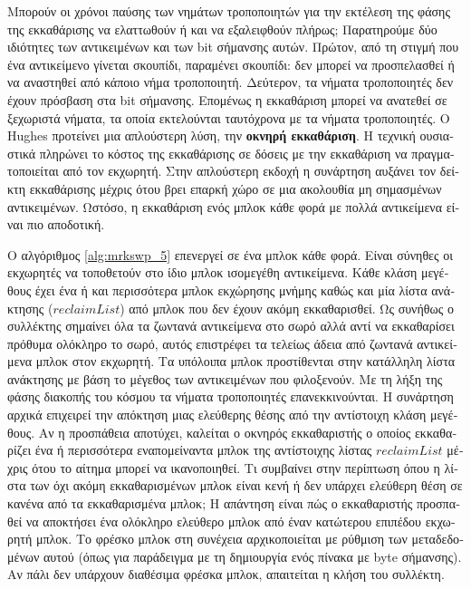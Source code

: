 \begin{greek}
Μπορούν οι χρόνοι παύσης των νημάτων τροποποιητών για την εκτέλεση 
της φάσης της εκκαθάρισης να ελαττωθούν ή και να εξαλειφθούν 
πλήρως; Παρατηρούμε δύο ιδιότητες των αντικειμένων και των bit
σήμανσης αυτών. Πρώτον, από τη στιγμή που ένα αντικείμενο γίνεται
σκουπίδι, παραμένει σκουπίδι: δεν μπορεί να προσπελασθεί ή να
αναστηθεί από κάποιο νήμα τροποποιητή. Δεύτερον, τα νήματα
τροποποιητές δεν έχουν πρόσβαση στα bit σήμανσης. Επομένως η
εκκαθάριση μπορεί να ανατεθεί σε ξεχωριστά νήματα, τα οποία 
εκτελούνται ταυτόχρονα με τα νήματα τροποποιητές. Ο Hughes \cite{hughes1982semi} προτείνει μια απλούστερη λύση, την \textbf{οκνηρή εκκαθάριση}.
Η τεχνική ουσιαστικά πληρώνει το κόστος της εκκαθάρισης σε δόσεις 
με την εκκαθάριση να πραγματοποιείται από τον εκχωρητή. Στην 
απλούστερη εκδοχή η συνάρτηση \textenglish{} αυξάνει τον
δείκτη εκκαθάρισης μέχρις ότου βρει επαρκή χώρο σε μια ακολουθία
μη σημασμένων αντικειμένων. Ωστόσο, η εκκαθάριση ενός μπλοκ κάθε 
φορά με πολλά αντικείμενα είναι πιο αποδοτική. 

Ο αλγόριθμος \ref{alg:mrkswp_5} επενεργεί σε ένα μπλοκ κάθε 
φορά. Είναι σύνηθες οι εκχωρητές να τοποθετούν στο ίδιο μπλοκ
ισομεγέθη αντικείμενα. Κάθε κλάση μεγέθους έχει ένα ή και 
περισσότερα μπλοκ εκχώρησης μνήμης καθώς και μία λίστα ανάκτησης
($reclaimList$) από μπλοκ που δεν έχουν ακόμη εκκαθαρισθεί.
Ως συνήθως ο συλλέκτης σημαίνει όλα τα ζωντανά αντικείμενα στο 
σωρό αλλά αντί να εκκαθαρίσει πρόθυμα ολόκληρο το σωρό, αυτός
επιστρέφει τα τελείως άδεια από ζωντανά αντικείμενα μπλοκ στον
εκχωρητή. Τα υπόλοιπα μπλοκ προστίθενται στην κατάλληλη λίστα
ανάκτησης με βάση το μέγεθος των αντικειμένων που φιλοξενούν.
Με τη λήξη της φάσης διακοπής του κόσμου τα νήματα τροποποιητές
επανεκκινούνται. Η συνάρτηση \textenglish{} αρχικά επιχειρεί
την απόκτηση μιας ελεύθερης θέσης από την αντίστοιχη κλάση 
μεγέθους. Αν η προσπάθεια αποτύχει, καλείται ο οκνηρός εκκαθαριστής
ο οποίος εκκαθαρίζει ένα ή περισσότερα εναπομείναντα μπλοκ της
αντίστοιχης λίστας $reclaimList$ μέχρις ότου το αίτημα μπορεί
να ικανοποιηθεί. Τι συμβαίνει στην περίπτωση όπου η λίστα των
όχι ακόμη εκκαθαρισμένων μπλοκ είναι κενή ή δεν υπάρχει ελεύθερη
θέση σε κανένα από τα εκκαθαρισμένα μπλοκ; Η απάντηση είναι πώς
ο εκκαθαριστής προσπαθεί να αποκτήσει ένα ολόκληρο ελεύθερο μπλοκ
από έναν κατώτερου επιπέδου εκχωρητή μπλοκ. Το φρέσκο μπλοκ
στη συνέχεια αρχικοποιείται με ρύθμιση των μεταδεδομένων αυτού
(όπως για παράδειγμα με τη δημιουργία ενός πίνακα με byte σήμανσης).
Αν πάλι δεν υπάρχουν διαθέσιμα φρέσκα μπλοκ, απαιτείται η κλήση
του συλλέκτη.


\end{greek}
